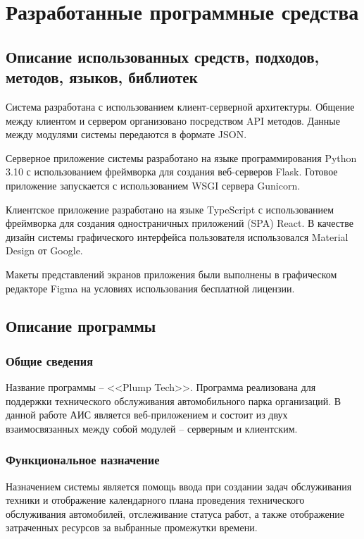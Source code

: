 \documentclass[../nirs.tex]{subfiles}
\begin{document}
    \section{Разработанные программные средства}
    \subsection{Описание использованных средств, подходов, методов, языков,
        библиотек}

    Система разработана с использованием клиент-серверной архитектуры. Общение
    между клиентом и сервером организовано посредством API методов. Данные
    между модулями системы передаются в формате JSON.

    Серверное приложение системы разработано на языке программирования Python
    3.10 с использованием фреймворка для создания веб-серверов Flask. Готовое
    приложение запускается с использованием WSGI сервера Gunicorn.

    Клиентское приложение разработано на языке TypeScript с использованием
    фреймворка для создания одностраничных приложений (SPA) React. В качестве
    дизайн системы графического интерфейса пользователя использовался Material
    Design от Google.

    Макеты представлений экранов приложения были выполнены в графическом
    редакторе Figma на условиях использования бесплатной лицензии.

    \subsection{Описание программы}

    \subsubsection*{Общие сведения}

    Название программы -- <<Plump Tech>>. Программа реализована для поддержки
    технического обслуживания автомобильного парка организаций. В данной работе
    АИС является веб-приложением и состоит из двух взаимосвязанных между собой
    модулей -- серверным и клиентским.

    \subsubsection*{Функциональное назначение}

    Назначением системы является помощь ввода при создании задач обслуживания
    техники и отображение календарного плана проведения технического
    обслуживания автомобилей, отслеживание статуса работ, а также отображение
    затраченных ресурсов за выбранные промежутки времени.
\end{document}
